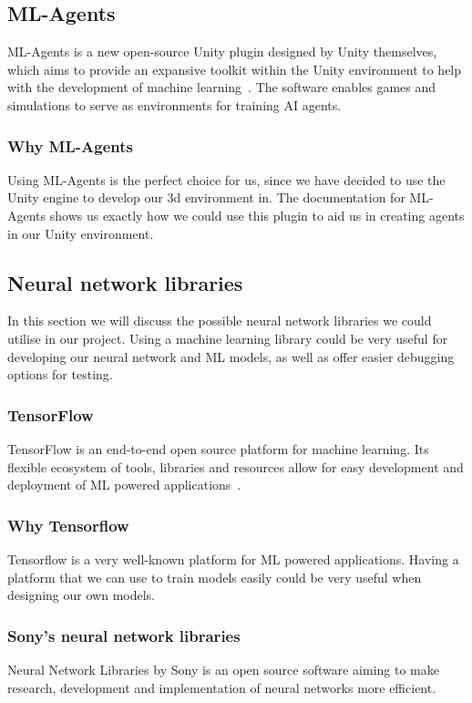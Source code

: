 \subsection{ML-Agents}
ML-Agents is a new open-source Unity plugin designed by Unity themselves, which aims to provide an expansive toolkit within the Unity environment to help with the development of machine learning~\cite{mlagit}. The software enables games and simulations to serve as environments for training AI agents. 

\subsubsection{Why ML-Agents}
Using ML-Agents is the perfect choice for us, since we have decided to use the Unity engine to develop our 3d environment in. The documentation for ML-Agents shows us exactly how we could use this plugin to aid us in creating agents in our Unity environment.

\subsection{Neural network libraries}
In this section we will discuss the possible neural network libraries we could utilise in our project. Using a machine learning library could be very useful for developing our neural network and ML models, as well as offer easier debugging options for testing.

\subsubsection{TensorFlow}
TensorFlow is an end-to-end open source platform for machine learning. Its flexible ecosystem of tools, libraries and resources allow for easy development and deployment of ML powered applications~\cite{tensor}.
\subsubsection{Why Tensorflow}
Tensorflow is a very well-known platform for ML powered applications. Having a platform that we can use to train models easily could be very useful when designing our own models.~\cite{tensortut}

\subsubsection{Sony’s neural network libraries}
Neural Network Libraries by Sony is an open source software aiming to make research, development and implementation of neural networks more efficient.~\cite{sony}

